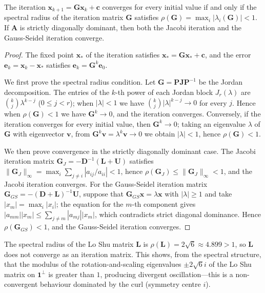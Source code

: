 \begin{theorem}\label{thm:iteration_convergence}
The iteration $\mathbf{x}_{k+1} = \mathbf{G} \mathbf{x}_k + \mathbf{c}$ converges for every initial value if and only if the spectral radius of the iteration matrix $\mathbf{G}$ satisfies $\rho(\mathbf{G}) = \max_i |\lambda_i(\mathbf{G})| < 1$. If $\mathbf{A}$ is strictly diagonally dominant, then both the Jacobi iteration and the Gauss-Seidel iteration converge.
\end{theorem}

\begin{proof}
The fixed point $\mathbf{x}_*$ of the iteration satisfies $\mathbf{x}_* = \mathbf{G}\mathbf{x}_* + \mathbf{c}$, and the error $\mathbf{e}_k = \mathbf{x}_k - \mathbf{x}_*$ satisfies $\mathbf{e}_k = \mathbf{G}^k \mathbf{e}_0$.

We first prove the spectral radius condition. Let $\mathbf{G} = \mathbf{P}\mathbf{J}\mathbf{P}^{-1}$ be the Jordan decomposition. The entries of the $k$-th power of each Jordan block $J_r(\lambda)$ are $\binom{k}{j}\lambda^{k-j}$ ($0 \le j < r$); when $|\lambda| < 1$ we have $\binom{k}{j}|\lambda|^{k-j} \to 0$ for every $j$. Hence when $\rho(\mathbf{G}) < 1$ we have $\mathbf{G}^k \to 0$, and the iteration converges. Conversely, if the iteration converges for every initial value, then $\mathbf{G}^k \to 0$; taking an eigenvalue $\lambda$ of $\mathbf{G}$ with eigenvector $\mathbf{v}$, from $\mathbf{G}^k\mathbf{v} = \lambda^k\mathbf{v} \to 0$ we obtain $|\lambda| < 1$, hence $\rho(\mathbf{G}) < 1$.

We then prove convergence in the strictly diagonally dominant case. The Jacobi iteration matrix $\mathbf{G}_J = -\mathbf{D}^{-1}(\mathbf{L}+\mathbf{U})$ satisfies $\|\mathbf{G}_J\|_\infty = \max_i \sum_{j \neq i}|a_{ij}/a_{ii}| < 1$, hence $\rho(\mathbf{G}_J) \le \|\mathbf{G}_J\|_\infty < 1$, and the Jacobi iteration converges. For the Gauss-Seidel iteration matrix $\mathbf{G}_{GS} = -(\mathbf{D}+\mathbf{L})^{-1}\mathbf{U}$, suppose that $\mathbf{G}_{GS}\mathbf{x} = \lambda\mathbf{x}$ with $|\lambda| \ge 1$ and take $|x_m| = \max_i |x_i|$; the equation for the $m$-th component gives $|a_{mm}||x_m| \le \sum_{j\neq m}|a_{mj}||x_m|$, which contradicts strict diagonal dominance. Hence $\rho(\mathbf{G}_{GS}) < 1$, and the Gauss-Seidel iteration converges.
\end{proof}

\begin{remark}\label{rem:luoshu_iteration}
The spectral radius of the Lo Shu matrix $\mathbf{L}$ is $\rho(\mathbf{L}) = 2\sqrt{6} \approx 4.899 > 1$, so $\mathbf{L}$ does not converge as an iteration matrix. This shows, from the spectral structure, that the modulus of the rotation-and-scaling eigenvalues $\pm 2\sqrt{6}i$ of the Lo Shu matrix on $\mathbf{1}^\perp$ is greater than $1$, producing divergent oscillation---this is a non-convergent behaviour dominated by the curl (symmetry centre $i$).
\end{remark}


